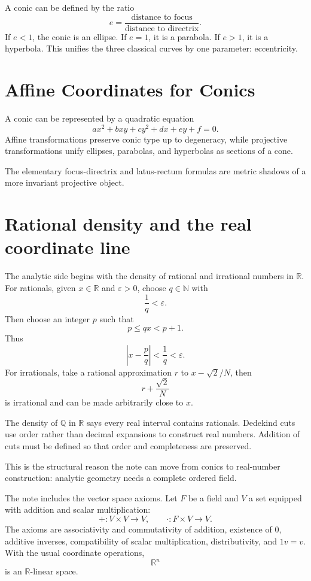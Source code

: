 A conic can be defined by the ratio
\[
  e=\frac{\text{distance to focus}}{\text{distance to directrix}}.
\]
If \(e<1\), the conic is an ellipse.  If \(e=1\), it is a parabola.  If \(e>1\), it is a hyperbola.  This unifies the three classical curves by one parameter: eccentricity.

\section{Affine Coordinates for Conics}

A conic can be represented by a quadratic equation
\[
  ax^2+bxy+cy^2+dx+ey+f=0.
\]
Affine transformations preserve conic type up to degeneracy, while projective transformations unify ellipses, parabolas, and hyperbolas as sections of a cone.

The elementary focus-directrix and latus-rectum formulas are metric shadows of a more invariant projective object.

\section{Rational density and the real coordinate line}

The analytic side begins with the density of rational and irrational numbers in \(\mathbb R\).  For rationals, given \(x\in\mathbb R\) and \(\varepsilon>0\), choose \(q\in\mathbb N\) with
\[
  \frac1q<\varepsilon.
\]
Then choose an integer \(p\) such that
\[
  p\le qx<p+1.
\]
Thus
\[
  \left|x-\frac pq\right|<\frac1q<\varepsilon.
\]
For irrationals, take a rational approximation \(r\) to \(x-\sqrt2/N\), then
\[
  r+\frac{\sqrt2}{N}
\]
is irrational and can be made arbitrarily close to \(x\).

The density of \(\mathbb Q\) in \(\mathbb R\) says every real interval contains rationals.  Dedekind cuts use order rather than decimal expansions to construct real numbers.  Addition of cuts must be defined so that order and completeness are preserved.

This is the structural reason the note can move from conics to real-number construction: analytic geometry needs a complete ordered field.

The note includes the vector space axioms.  Let \(F\) be a field and \(V\) a set equipped with addition and scalar multiplication:
\[
  +:V\times V\to V,\qquad \cdot:F\times V\to V.
\]
The axioms are associativity and commutativity of addition, existence of \(0\), additive inverses, compatibility of scalar multiplication, distributivity, and \(1v=v\).  With the usual coordinate operations,
\[
  \mathbb R^n
\]
is an \(\mathbb R\)-linear space.

